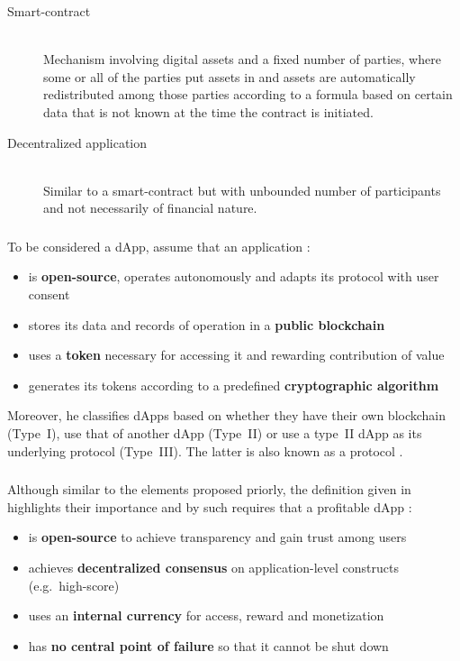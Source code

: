 \begin{description}
	\item[Smart-contract]
	\hfill \\
	Mechanism involving digital assets and a fixed number of parties, where some or all of the parties put assets in and assets are automatically redistributed among those parties according to a formula based on certain data that is not known at the time the contract is initiated.
	\item[Decentralized application]
	\hfill \\
	Similar to a smart-contract but with unbounded number of participants and not necessarily of financial nature.
\end{description}

\subsubsection{\citeyear{Johnston2015}}
\label{sec:2015definition}
To be considered a \ac{dApp}, \citeauthor{Johnston2015} assume that an application \cite[p.~2]{Johnston2015}:

\begin{itemize}
  \item is \textbf{open-source}, operates autonomously and adapts its protocol with user consent 
  \item stores its data and records of operation in a \textbf{public blockchain}
  \item uses a \textbf{token} necessary for accessing it and rewarding contribution of value
  \item generates its tokens according to a predefined \textbf{cryptographic algorithm}
\end{itemize}

Moreover, he classifies \acp{dApp} based on whether they have their own blockchain (Type~I), use that of another \ac{dApp} (Type~II) or use a type~II \ac{dApp} as its underlying protocol (Type~III). The latter is also known as a protocol \cite[pp.~3--4]{Johnston2015}.

\subsubsection{\citeyear{Raval.2016}}
Although similar to the elements proposed priorly, the definition given in  highlights their importance and by such requires that a profitable \ac{dApp} \cite[pp.~9--14]{Raval.2016}:
 
 \begin{itemize}
  \item is \textbf{open-source} to achieve transparency and gain trust among users 
  \item achieves \textbf{decentralized consensus} on application-level constructs (e.g.~high-score)
  \item uses an \textbf{internal currency} for access, reward and monetization
  \item has \textbf{no central point of failure} so that it cannot be shut down
\end{itemize}

